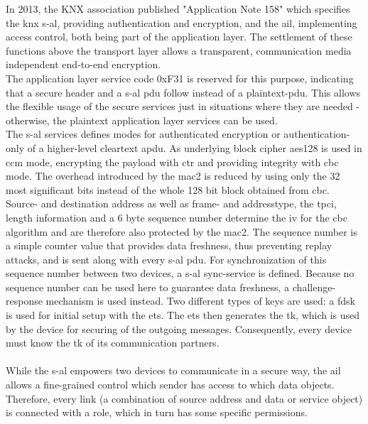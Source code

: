 In 2013, the KNX association published "Application Note 158" \cite{knx_data_sec} which specifies the \gls{knx} \gls{s-al}, providing
authentication and encryption, and the \gls{ail}, implementing access control, both being part of the application layer.
The settlement of these functions above the transport layer allows a transparent, communication media independent end-to-end encryption.
\\
The application layer service code 0xF31 is reserved for this purpose, indicating that a secure header and a \gls{s-al} \gls{pdu} 
follow instead of a plaintext-\gls{pdu}. This allows the flexible usage of the secure services just in situations where they are needed - otherwise, the plaintext application
layer services can be used.
\\
The \gls{s-al} services defines modes for authenticated encryption or authentication-only of a higher-level cleartext \gls{apdu}. As underlying block cipher
\gls{aes}128 is used in \gls{ccm} mode, encrypting the payload with \gls{ctr} and providing integrity with \gls{cbc} mode. The overhead introduced by the 
\gls{mac2} is reduced by 
using only the 32 most significant bits instead of the whole 128 bit block obtained from \gls{cbc}. Source- and destination address as well as
frame- and addresstype, the \gls{tpci}, length information and a 6 byte sequence number determine the \gls{iv} for the \gls{cbc} algorithm and are therefore also protected by the \gls{mac2}.
The sequence number is a simple counter value that provides data freshness, thus preventing replay attacks, and is sent along with every \gls{s-al} \gls{pdu}.
For synchronization of this sequence number between two devices, a \gls{s-al} sync-service is defined. Because no sequence number can be used here to guarantee
data freshness, a challenge-response mechanism is used instead.
Two different types of keys are used: a \gls{fdsk} is used for initial setup with the \gls{ets}. The \gls{ets} then generates the \gls{tk}, which is used by the
device for securing of the outgoing messages. Consequently, every device must know the \gls{tk} of its communication partners.
\\
\\
While the \gls{s-al} empowers two devices to communicate in a secure way, the \gls{ail} allows a fine-grained control which sender has access to which
data objects. Therefore, every link (a combination of source address and data or service object) is connected with a role, which in turn
has some specific permissions. 

